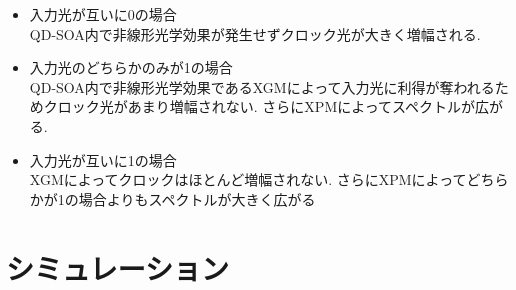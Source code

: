 \documentclass[dvipdfmx]{ujarticle}
\begin{document}
    \begin{itemize}
      \item 入力光が互いに0の場合 \\
      QD-SOA内で非線形光学効果が発生せずクロック光が大きく増幅される.
      \item 入力光のどちらかのみが1の場合 \\
      QD-SOA内で非線形光学効果であるXGMによって入力光に利得が奪われるためクロック光があまり増幅されない.
      さらにXPMによってスペクトルが広がる.
      \item 入力光が互いに1の場合 \\
      XGMによってクロックはほとんど増幅されない.
      さらにXPMによってどちらかが1の場合よりもスペクトルが大きく広がる
    \end{itemize}

\section{シミュレーション}
\end{document}
